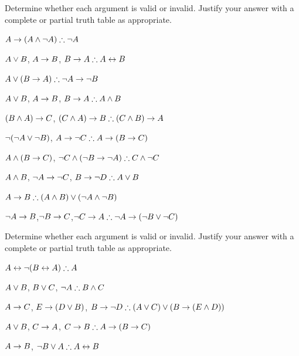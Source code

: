 \noindent\problempart Determine whether each argument is valid or invalid. Justify your answer with a complete or partial truth table as appropriate.
\label{pr.TT.valid5} 
\begin{compactlist}
\item $A\rightarrow(A\wedge\neg A)\therefore \neg A$ \hfill {}
\item $A \vee B$, $A \rightarrow B$, $B \rightarrow A \therefore  A \leftrightarrow B$  \hfill {}
\item $A\vee(B\rightarrow A)\therefore \neg A \rightarrow \neg B$ \hfill {}
\item $A \vee B$, $A \rightarrow B$, $ B \rightarrow A \therefore  A \wedge B$ \hfill {}
\item $(B\wedge A)\rightarrow C$, $(C\wedge A)\rightarrow B\therefore (C\wedge B)\rightarrow A$ \hfill {}
\item $\neg (\neg A \vee \neg B)$, $A \rightarrow \neg C \therefore  A \rightarrow (B \rightarrow C)$ \hfill {}
\item $A \wedge (B \rightarrow C)$, $\neg C \wedge (\neg B \rightarrow \neg A)\therefore C \wedge \neg C$ \hfill {}
\item $A \wedge B$, $\neg A \rightarrow \neg C$, $B \rightarrow \neg D \therefore  A \vee B$ \hfill {}
\item $A \rightarrow B\therefore (A \wedge B) \vee (\neg A \wedge \neg B)$ \hfill {}
\item $\neg A \rightarrow B$,$ \neg B \rightarrow C $,$ \neg C \rightarrow A \therefore  \neg A \rightarrow (\neg B \vee \neg C)$ \hfill {}

\end{compactlist}

\noindent\problempart Determine whether each argument is valid or invalid. Justify your answer with a complete or partial truth table as appropriate.
\label{pr.TT.valid6} 
\begin{compactlist}
\item $A\leftrightarrow\neg(B\leftrightarrow A)\therefore A$ \hfill {}
\item $A\vee B$, $B\vee C$, $\neg A\therefore B \wedge C$ \hfill {}
\item $A \rightarrow C$, $E \rightarrow (D \vee B)$, $B \rightarrow \neg D\therefore (A \vee C) \vee (B \rightarrow (E \wedge D))$ \hfill {}
\item $A \vee B$, $C \rightarrow A$, $C \rightarrow B\therefore A \rightarrow (B \rightarrow C)$ \hfill {}
\item $A \rightarrow B$, $\neg B \vee A\therefore A \leftrightarrow B$ \hfill {}
\end{compactlist}

